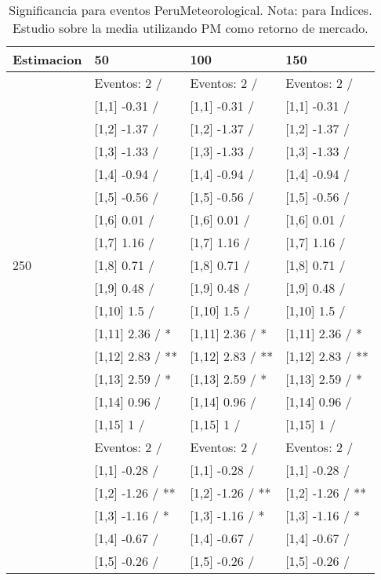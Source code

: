 \begin{table}

\caption{Significancia para eventos PeruMeteorological. Nota: para Indices. Estudio sobre la media utilizando PM como retorno de mercado.}
\centering
\begin{tabular}[t]{llll}
\toprule
Estimacion & 50 & 100 & 150\\
\midrule
 & Eventos:  2 / & Eventos:  2 / & Eventos:  2 /\\
 & {}[1,1] -0.31  / & {}[1,1] -0.31  / & {}[1,1] -0.31  /\\
 & {}[1,2] -1.37  / & {}[1,2] -1.37  / & {}[1,2] -1.37  /\\
 & {}[1,3] -1.33  / & {}[1,3] -1.33  / & {}[1,3] -1.33  /\\
 & {}[1,4] -0.94  / & {}[1,4] -0.94  / & {}[1,4] -0.94  /\\
\addlinespace
 & {}[1,5] -0.56  / & {}[1,5] -0.56  / & {}[1,5] -0.56  /\\
 & {}[1,6] 0.01  / & {}[1,6] 0.01  / & {}[1,6] 0.01  /\\
 & {}[1,7] 1.16  / & {}[1,7] 1.16  / & {}[1,7] 1.16  /\\
250 & {}[1,8] 0.71  / & {}[1,8] 0.71  / & {}[1,8] 0.71  /\\
 & {}[1,9] 0.48  / & {}[1,9] 0.48  / & {}[1,9] 0.48  /\\
\addlinespace
 & {}[1,10] 1.5  / & {}[1,10] 1.5  / & {}[1,10] 1.5  /\\
 & {}[1,11] 2.36  / * & {}[1,11] 2.36  / * & {}[1,11] 2.36  / *\\
 & {}[1,12] 2.83  / ** & {}[1,12] 2.83  / ** & {}[1,12] 2.83  / **\\
 & {}[1,13] 2.59  / * & {}[1,13] 2.59  / * & {}[1,13] 2.59  / *\\
 & {}[1,14] 0.96  / & {}[1,14] 0.96  / & {}[1,14] 0.96  /\\
\addlinespace
 & {}[1,15] 1  / & {}[1,15] 1  / & {}[1,15] 1  /\\
 & Eventos:  2 / & Eventos:  2 / & Eventos:  2 /\\
 & {}[1,1] -0.28  / & {}[1,1] -0.28  / & {}[1,1] -0.28  /\\
 & {}[1,2] -1.26  / ** & {}[1,2] -1.26  / ** & {}[1,2] -1.26  / **\\
 & {}[1,3] -1.16  / * & {}[1,3] -1.16  / * & {}[1,3] -1.16  / *\\
\addlinespace
 & {}[1,4] -0.67  / & {}[1,4] -0.67  / & {}[1,4] -0.67  /\\
 & {}[1,5] -0.26  / & {}[1,5] -0.26  / & {}[1,5] -0.26  /\\

\end{tabular}
\end{table}
